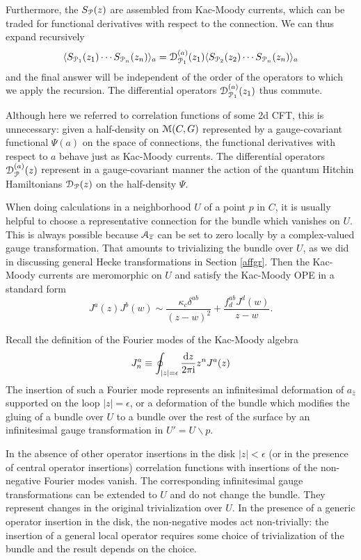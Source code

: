 \documentclass[11pt,a4paper]{article}
\begin{document}
Furthermore, the $S_{\cal P}(z)$ are assembled from Kac-Moody currents, which can be traded for functional derivatives with respect to 
the connection. We can thus expand recursively 
\begin{equation}
\langle S_{{\cal P}_1}(z_1) \cdots S_{{\cal P}_n}(z_n) \rangle_a = {\cal D}^{(a)}_{\P_1}(z_1 )\langle S_{{\cal P}_2}(z_2) \cdots S_{{\cal P}_n}(z_n) \rangle_a
\end{equation}
and the final answer will be independent of the order of the operators to which we apply the recursion. The differential operators ${\cal D}^{(a)}_{\P_1}(z_1 )$ thus commute. 

Although here we referred to correlation functions of some 2d CFT, this is unnecessary: given a half-density on $\M(C,G)$ represented by 
a gauge-covariant functional $\Psi(a)$ on the space of connections, the functional derivatives with respect to $a$ behave just as Kac-Moody currents.
The differential operators ${\cal D}^{(a)}_{\P}(z)$ represent in a gauge-covariant manner the action of the quantum Hitchin Hamiltonians 
${\cal D}_{\P}(z)$ on the half-density $\Psi$. 

When doing calculations in a neighborhood $U$ of a point $p$ in $C$, it is usually helpful to choose a representative connection for the bundle 
which vanishes on $U$. This is always possible because $\cA_{\bar z}$ can be set to zero locally by a complex-valued 
gauge transformation. That amounts to trivializing the bundle over $U$, as we did in discussing general Hecke transformations in Section
\ref{affgr}.  Then  the Kac-Moody currents are meromorphic on $U$ and satisfy the Kac-Moody OPE in a standard form
\begin{equation}
J^a(z) J^b(w) \sim \frac{\kappa_c \delta^{ab}}{(z-w)^2} + \frac{f^{ab}_d J^d(w)}{z-w}.
\end{equation}

Recall the definition of the Fourier modes of the Kac-Moody algebra
\begin{equation}
J^a_n \equiv \oint_{|z|=\epsilon} \frac{\d z}{2 \pi \i} z^n J^a(z)
\end{equation}
The insertion of such a Fourier mode represents an infinitesimal deformation of $a_{\bar z}$ supported on the loop $|z|=\epsilon$,
or a deformation of the bundle which modifies the gluing of a bundle over $U$ to a bundle over the rest of the surface by an infinitesimal gauge transformation in $U'=U\backslash p$.  

In the absence of other operator insertions in the disk $|z|<\epsilon$ (or in the presence of central operator insertions) correlation functions with insertions of
the non-negative Fourier modes vanish. The corresponding infinitesimal gauge transformations can be extended to $U$ and do not change the bundle. 
They represent changes in the original trivialization over $U$. In the presence of a generic operator insertion in the disk, 
the non-negative modes act non-trivially: the insertion of a general local operator requires some choice of trivialization of the bundle and 
the result depends on the choice. 
\end{document}
